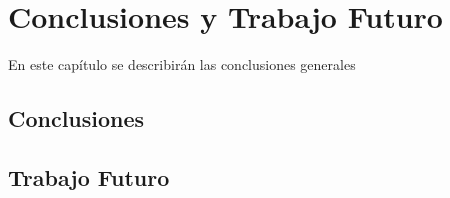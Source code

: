 \chapter{Conclusiones y Trabajo Futuro}
En este capítulo se describirán las conclusiones generales 


\section{Conclusiones}



\section{Trabajo Futuro}